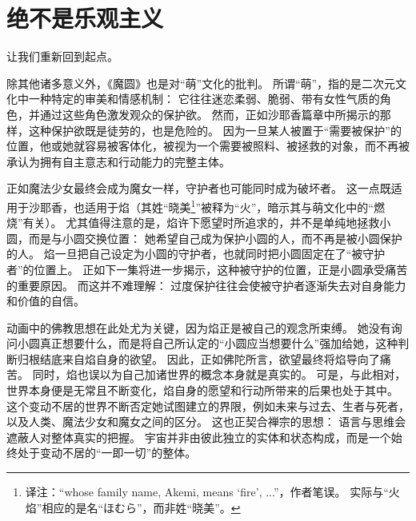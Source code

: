\chapter[绝不是乐观主义]{绝不是乐观主义}



让我们重新回到起点。

除其他诸多意义外，《魔圆》也是对“萌”文化的批判。
所谓“萌”，指的是二次元文化中一种特定的审美和情感机制：
它往往迷恋柔弱、脆弱、带有女性气质的角色，并通过这些角色激发观众的保护欲。
然而，正如沙耶香篇章中所揭示的那样，这种保护欲既是徒劳的，也是危险的。
因为一旦某人被置于“需要被保护”的位置，他或她就容易被客体化，被视为一个需要被照料、被拯救的对象，而不再被承认为拥有自主意志和行动能力的完整主体。

正如魔法少女最终会成为魔女一样，守护者也可能同时成为破坏者。
这一点既适用于沙耶香，也适用于焰（其姓“晓美\footnote{%
    译注：``whose family name, Akemi, means `fire', ...''，作者笔误。
    实际与“火焰”相应的是名“ほむら”，而非姓“晓美”。
}”被释为“火”，暗示其与萌文化中的“燃烧”有关）。
尤其值得注意的是，焰许下愿望时所追求的，并不是单纯地拯救小圆，而是与小圆交换位置：
她希望自己成为保护小圆的人，而不再是被小圆保护的人。
焰一旦把自己设定为小圆的守护者，也就同时把小圆固定在了“被守护者”的位置上。
正如下一集将进一步揭示，这种被守护的位置，正是小圆承受痛苦的重要原因。
而这并不难理解：
过度保护往往会使被守护者逐渐失去对自身能力和价值的自信。

动画中的佛教思想在此处尤为关键，因为焰正是被自己的观念所束缚。
她没有询问小圆真正想要什么，而是将自己所认定的“小圆应当想要什么”强加给她，这种判断归根结底来自焰自身的欲望。
因此，正如佛陀所言，欲望最终将焰导向了痛苦\cite{ref62}。
同时，焰也误以为自己加诸世界的概念本身就是真实的。
可是，与此相对，世界本身便是无常且不断变化，焰自身的愿望和行动所带来的后果也处于其中。
这个变动不居的世界不断否定她试图建立的界限，例如未来与过去、生者与死者，以及人类、魔法少女和魔女之间的区分。
这也正契合禅宗的思想：
语言与思维会遮蔽人对整体真实的把握。
宇宙并非由彼此独立的实体和状态构成，而是一个始终处于变动不居的“一即一切”的整体\cite{ref63}。

